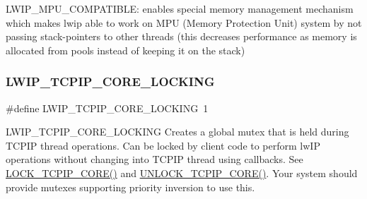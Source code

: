 L\+W\+I\+P\+\_\+\+M\+P\+U\+\_\+\+C\+O\+M\+P\+A\+T\+I\+B\+LE\+: enables special memory management mechanism which makes lwip able to work on M\+PU (Memory Protection Unit) system by not passing stack-\/pointers to other threads (this decreases performance as memory is allocated from pools instead of keeping it on the stack) \mbox{\label{group__lwip__opts__lock_ga8e46232794349c209e8ed4e9e7e4f011}} 
\subsubsection{\texorpdfstring{L\+W\+I\+P\+\_\+\+T\+C\+P\+I\+P\+\_\+\+C\+O\+R\+E\+\_\+\+L\+O\+C\+K\+I\+NG}{LWIP\_TCPIP\_CORE\_LOCKING}\hspace{0.1cm}{\footnotesize\ttfamily [1/2]}}
{\footnotesize\ttfamily \#define L\+W\+I\+P\+\_\+\+T\+C\+P\+I\+P\+\_\+\+C\+O\+R\+E\+\_\+\+L\+O\+C\+K\+I\+NG~1}

L\+W\+I\+P\+\_\+\+T\+C\+P\+I\+P\+\_\+\+C\+O\+R\+E\+\_\+\+L\+O\+C\+K\+I\+NG Creates a global mutex that is held during T\+C\+P\+IP thread operations. Can be locked by client code to perform lw\+IP operations without changing into T\+C\+P\+IP thread using callbacks. See \hyperlink{native_2lwip_2src_2include_2lwip_2tcpip_8h_a4700525e737fc025fea4887b172e0c95}{L\+O\+C\+K\+\_\+\+T\+C\+P\+I\+P\+\_\+\+C\+O\+R\+E()} and \hyperlink{native_2lwip_2src_2include_2lwip_2tcpip_8h_a915effea029b9c4891e1ec635eb1826d}{U\+N\+L\+O\+C\+K\+\_\+\+T\+C\+P\+I\+P\+\_\+\+C\+O\+R\+E()}. Your system should provide mutexes supporting priority inversion to use this. \mbox{\label{group__lwip__opts__lock_ga8e46232794349c209e8ed4e9e7e4f011}} 
